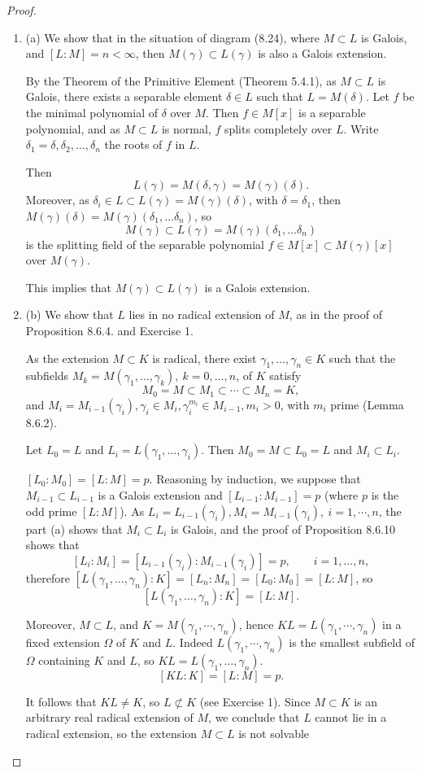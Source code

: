 \documentclass[11pt,a4paper]{article}
\newcommand{\be} {\begin{enumerate}}
\newcommand{\ee} {\end{enumerate}}
\begin{document}
\begin{proof}
\be 
\item[(a)] We show that in the situation of diagram (8.24), where $M \subset L$ is Galois, and $[L:M] = n < \infty$, then $M(\gamma) \subset L(\gamma)$ is also a Galois extension.

By the Theorem of the Primitive Element (Theorem 5.4.1), as $M \subset L$ is Galois, there exists a separable element $\delta \in L$ such that $L = M(\delta)$. Let $f$ be the minimal polynomial of $\delta$ over $M$. Then $f \in M[x]$ is a separable polynomial, and as $M \subset L$ is normal, $f$ splits completely over $L$. Write $\delta_1 = \delta, \delta_2,\ldots,\delta_n$ the roots of $f$ in $L$. 

Then $$L(\gamma) = M(\delta,\gamma) = M(\gamma) (\delta).$$
Moreover, as $\delta_i \in L \subset L(\gamma) = M(\gamma) (\delta)$, with $\delta = \delta_1$, then $M(\gamma) (\delta) = M(\gamma)(\delta_1,\ldots \delta_n)$, so
$$M(\gamma) \subset L(\gamma) = M(\gamma)(\delta_1,\ldots \delta_n)$$
is the splitting field of the separable polynomial $f\in M[x] \subset M(\gamma)[x]$ over $M(\gamma)$. 

This implies that $M(\gamma) \subset L(\gamma)$ is  a Galois extension.

\item[(b)] We show that $L$ lies in no radical extension of $M$, as in the proof of Proposition 8.6.4. and Exercise 1.

As the extension $M\subset K$ is radical, there exist  $\gamma_1, \ldots,\gamma_n \in K$ such that the subfields  $M_k = M(\gamma_1,\ldots,\gamma_k),\ k=0,\ldots,n$, of $K$ satisfy
$$M_0 = M \subset M_1 \subset \cdots \subset M_n = K,$$
and $M_i = M_{i-1}(\gamma_i), \gamma_i \in M_i, \gamma_i^{m_i} \in M_{i-1}, m_i>0$, with $m_i$ prime (Lemma 8.6.2).

Let $L_0 = L$ and $L_i = L(\gamma_1,\ldots, \gamma_i)$. Then $M_0=M  \subset L_0 = L$ and $M_i \subset L_i$. 


$[L_0:M_0]=[L:M]=p$. Reasoning by induction, we suppose that $M_{i-1}\subset L_{i-1}$ is a Galois extension and $[L_{i-1} : M_{i-1}] = p$ (where $p$ is the odd prime  $[L:M]$). As $L_i = L_{i-1}(\gamma_i), M_i =M_{i-1}(\gamma_i),\ i=1,\cdots,n$, the part (a) shows that $M_{i}\subset L_{i}$ is Galois, and the proof of Proposition 8.6.10 shows that 
$$[L_i : M_i] = [L_{i-1}(\gamma_i) : M_{i-1}(\gamma_i)] = p, \qquad  i=1,\ldots,n,$$ therefore 
$[L(\gamma_1,\ldots,\gamma_n):K] = [L_n:M_n] = [L_0:M_0] = [L:M]$, so
$$[L(\gamma_1,\ldots,\gamma_n):K] = [L:M].$$

Moreover, $M\subset L$, and $K = M(\gamma_1,\cdots,\gamma_n)$, hence $KL = L(\gamma_1,\cdots, \gamma_n)$ in a fixed extension $\Omega$ of $K$ and $L$. Indeed  $L(\gamma_1,\cdots, \gamma_n)$ is the smallest subfield of $\Omega$ containing $K$ and $L$, so $KL = L(\gamma_1,\ldots, \gamma_n)$.
$$[KL : K] = [L:M] = p.$$

It follows that $KL \ne K$, so $L \not \subset K$ (see Exercise 1). Since $M \subset K$ is an arbitrary real radical extension of $M$, we conclude that $L$ cannot lie in a radical extension, so the extension $M \subset L$ is not solvable
\ee
\end{proof}
\end{document}
